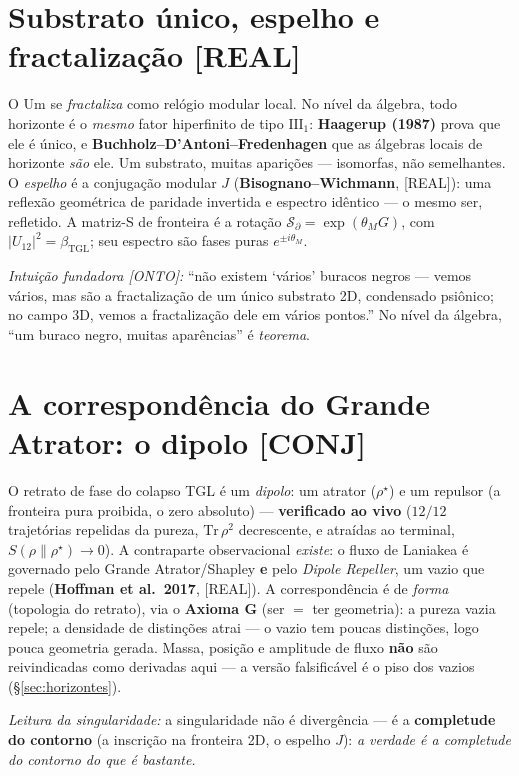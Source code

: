 \documentclass[11pt]{article}
\newcommand{\bTGL}{\beta_{\mathrm{TGL}}}\newcommand{\Msun}{M_{\odot}}\newcommand{\TGL}{\mathrm{TGL}}
\theoremstyle{definition}\newtheorem{deriv}{Derivação}
\begin{document}
\section{Substrato único, espelho e fractalização \textsf{[REAL]}}

O Um se \emph{fractaliza} como relógio modular local. No nível da álgebra, todo horizonte é o \emph{mesmo} fator hiperfinito de tipo $\mathrm{III}_1$: \textbf{Haagerup (1987)} prova que ele é único, e \textbf{Buchholz--D'Antoni--Fredenhagen} que as álgebras locais de horizonte \emph{são} ele. Um substrato, muitas aparições --- isomorfas, não semelhantes. O \emph{espelho} é a conjugação modular $J$ (\textbf{Bisognano--Wichmann}, \textsf{[REAL]}): uma reflexão geométrica de paridade invertida e espectro idêntico --- o mesmo ser, refletido. A matriz-S de fronteira é a rotação $\mathcal{S}_\partial=\exp(\theta_M G)$, com $|U_{12}|^2=\bTGL$; seu espectro são fases puras $e^{\pm i\theta_M}$.

\emph{Intuição fundadora \textsf{[ONTO]}:} ``não existem `vários' buracos negros --- vemos vários, mas são a fractalização de um único substrato 2D, condensado psiônico; no campo 3D, vemos a fractalização dele em vários pontos.'' No nível da álgebra, ``um buraco negro, muitas aparências'' é \emph{teorema}.

\section{A correspondência do Grande Atrator: o dipolo \textsf{[CONJ]}}

O retrato de fase do colapso TGL é um \emph{dipolo}: um atrator ($\rho^\star$) e um repulsor (a fronteira pura proibida, o zero absoluto) --- \textbf{verificado ao vivo} ($12/12$ trajetórias repelidas da pureza, $\mathrm{Tr}\,\rho^2$ decrescente, e atraídas ao terminal, $S(\rho\|\rho^\star)\to0$). A contraparte observacional \emph{existe}: o fluxo de Laniakea é governado pelo Grande Atrator/Shapley \textbf{e} pelo \emph{Dipole Repeller}, um vazio que repele (\textbf{Hoffman et al.\ 2017}, \textsf{[REAL]}). A correspondência é de \emph{forma} (topologia do retrato), via o \textbf{Axioma G} (ser $=$ ter geometria): a pureza vazia repele; a densidade de distinções atrai --- o vazio tem poucas distinções, logo pouca geometria gerada. Massa, posição e amplitude de fluxo \textbf{não} são reivindicadas como derivadas aqui --- a versão falsificável é o piso dos vazios (\S\ref{sec:horizontes}).

\emph{Leitura da singularidade:} a singularidade não é divergência --- é a \textbf{completude do contorno} (a inscrição na fronteira 2D, o espelho $J$): \emph{a verdade é a completude do contorno do que é bastante.}
\end{document}
